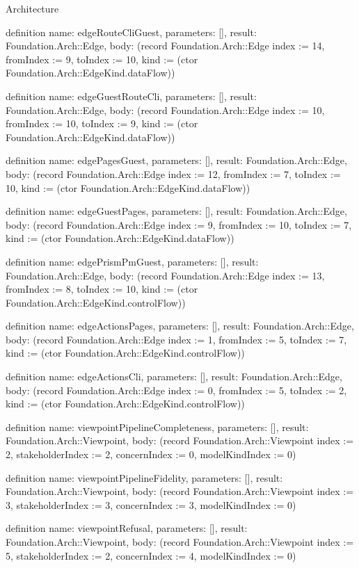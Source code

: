 \begin{lexlean}{Architecture}
\begin{semanticmodule}
definition{
  name: edgeRouteCliGuest,
  parameters: [],
  result: Foundation.Arch::Edge,
  body: (record Foundation.Arch::Edge {index := 14, fromIndex := 9, toIndex := 10, kind := (ctor Foundation.Arch::EdgeKind.dataFlow)})
}

definition{
  name: edgeGuestRouteCli,
  parameters: [],
  result: Foundation.Arch::Edge,
  body: (record Foundation.Arch::Edge {index := 10, fromIndex := 10, toIndex := 9, kind := (ctor Foundation.Arch::EdgeKind.dataFlow)})
}

definition{
  name: edgePagesGuest,
  parameters: [],
  result: Foundation.Arch::Edge,
  body: (record Foundation.Arch::Edge {index := 12, fromIndex := 7, toIndex := 10, kind := (ctor Foundation.Arch::EdgeKind.dataFlow)})
}

definition{
  name: edgeGuestPages,
  parameters: [],
  result: Foundation.Arch::Edge,
  body: (record Foundation.Arch::Edge {index := 9, fromIndex := 10, toIndex := 7, kind := (ctor Foundation.Arch::EdgeKind.dataFlow)})
}

definition{
  name: edgePrismPmGuest,
  parameters: [],
  result: Foundation.Arch::Edge,
  body: (record Foundation.Arch::Edge {index := 13, fromIndex := 8, toIndex := 10, kind := (ctor Foundation.Arch::EdgeKind.controlFlow)})
}

definition{
  name: edgeActionsPages,
  parameters: [],
  result: Foundation.Arch::Edge,
  body: (record Foundation.Arch::Edge {index := 1, fromIndex := 5, toIndex := 7, kind := (ctor Foundation.Arch::EdgeKind.controlFlow)})
}

definition{
  name: edgeActionsCli,
  parameters: [],
  result: Foundation.Arch::Edge,
  body: (record Foundation.Arch::Edge {index := 0, fromIndex := 5, toIndex := 2, kind := (ctor Foundation.Arch::EdgeKind.controlFlow)})
}

definition{
  name: viewpointPipelineCompleteness,
  parameters: [],
  result: Foundation.Arch::Viewpoint,
  body: (record Foundation.Arch::Viewpoint {index := 2, stakeholderIndex := 2, concernIndex := 0, modelKindIndex := 0})
}

definition{
  name: viewpointPipelineFidelity,
  parameters: [],
  result: Foundation.Arch::Viewpoint,
  body: (record Foundation.Arch::Viewpoint {index := 3, stakeholderIndex := 3, concernIndex := 3, modelKindIndex := 0})
}

definition{
  name: viewpointRefusal,
  parameters: [],
  result: Foundation.Arch::Viewpoint,
  body: (record Foundation.Arch::Viewpoint {index := 5, stakeholderIndex := 2, concernIndex := 4, modelKindIndex := 0})
}


\end{semanticmodule}
\end{lexlean}
